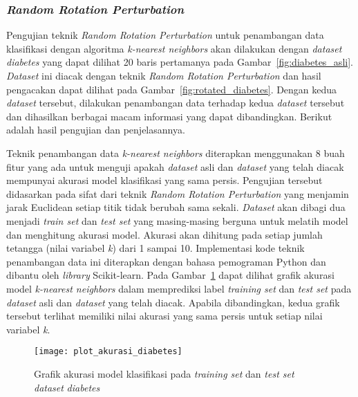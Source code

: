 \subsubsection{\textit{Random Rotation Perturbation}}
\label{subsubsec:pengujian-klasifikasi-rrp}

Pengujian teknik \textit{Random Rotation Perturbation} untuk penambangan data klasifikasi dengan algoritma \textit{k-nearest neighbors} akan dilakukan dengan \textit{dataset} \textit{diabetes} yang dapat dilihat 20 baris pertamanya pada Gambar~\ref{fig:diabetes_asli}. \textit{Dataset} ini diacak dengan teknik \textit{Random Rotation Perturbation} dan hasil pengacakan dapat dilihat pada Gambar~\ref{fig:rotated_diabetes}. Dengan kedua \textit{dataset} tersebut, dilakukan penambangan data terhadap kedua \textit{dataset} tersebut dan dihasilkan berbagai macam informasi yang dapat dibandingkan. Berikut adalah hasil pengujian dan penjelasannya.

Teknik penambangan data \textit{k-nearest neighbors} diterapkan menggunakan 8 buah fitur yang ada untuk menguji apakah \textit{dataset} asli dan \textit{dataset} yang telah diacak mempunyai akurasi model klasifikasi yang sama persis. Pengujian tersebut didasarkan pada sifat dari teknik \textit{Random Rotation Perturbation} yang menjamin jarak Euclidean setiap titik tidak berubah sama sekali. \textit{Dataset} akan dibagi dua menjadi \textit{train set} dan \textit{test set} yang masing-masing berguna untuk melatih model dan menghitung akurasi model. Akurasi akan dihitung pada setiap jumlah tetangga (nilai variabel \textit{k}) dari 1 sampai 10. Implementasi kode teknik penambangan data ini diterapkan dengan bahasa pemograman Python dan dibantu oleh \textit{library} Scikit-learn. Pada Gambar~\ref{fig:plot_akurasi_diabetes} dapat dilihat grafik akurasi model \textit{k-nearest neighbors} dalam memprediksi label \textit{training set} dan \textit{test set} pada \textit{dataset} asli dan \textit{dataset} yang telah diacak. Apabila dibandingkan, kedua grafik tersebut terlihat memiliki nilai akurasi yang sama persis untuk setiap nilai variabel \textit{k}. 

\begin{figure}
	\centering
	\texttt{[image: plot\_akurasi\_diabetes]}
	\caption{Grafik akurasi model klasifikasi pada \textit{training set} dan \textit{test set} \textit{dataset} \textit{diabetes}}
	\label{fig:plot_akurasi_diabetes}
\end{figure}

